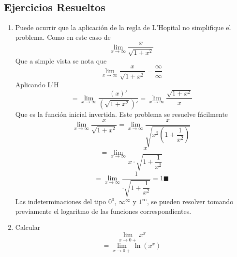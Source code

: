 \documentclass[10pt,twoside]{SelfArx} %
\begin{document}
  
  
  \subsection{Ejercicios Resueltos}
  
   \begin{enumerate}%
		\item  Puede ocurrir que la aplicación de la regla de L'Hopital no simplifique el problema. Como en este caso de 
		\begin{equation}
		\lim\limits_{x\rightarrow\infty}\dfrac{x}{\sqrt{1+x^{2}}}
		\end{equation}
   	Que a simple vista se nota que 
   	\begin{equation}
   	\lim\limits_{x\rightarrow\infty}\dfrac{x}{\sqrt{1+x^{2}}}=\dfrac{\infty}{\infty}
   	\end{equation}
   	Aplicando L'H
   	\begin{equation}
   	=\lim\limits_{x\rightarrow\infty}\dfrac{(x)'}{(\sqrt{1+x^{2}})'}=\lim\limits_{x\rightarrow\infty}\dfrac{\sqrt{1+x^{2}}}{x}
   	\end{equation}
   	Que es la función inicial invertida. Este problema se resuelve fácilmente 
\begin{equation}
   	\lim\limits_{x\rightarrow\infty}\dfrac{x}{\sqrt{1+x^{2}}}=\lim\limits_{x\rightarrow\infty}\dfrac{x}{\sqrt{x^{2}\left (1+\dfrac{1}{x^{2}}\right )}}
\end{equation}
   	\begin{equation}
   	=\lim\limits_{x\rightarrow\infty}\dfrac{x}{x\cdot\sqrt{1+\dfrac{1}{x^{2}}}}
   	\end{equation}
   	\begin{equation}
   	=\lim\limits_{x\rightarrow\infty}\dfrac{1}{\cdot\sqrt{1+\dfrac{1}{x^{2}}}}=1\blacksquare
   	\end{equation}
   	Las indeterminaciones del tipo $ 0^{0} $, $ \infty^{\infty} $ y $ 1^{\infty} $, se pueden resolver tomando previamente el logaritmo de las funciones correspondientes.\\
   	\item Calcular 
   	\begin{equation}
   	\lim\limits_{x\rightarrow0+}x^{x}
   	\end{equation}
\begin{equation}
   	=\lim\limits_{x\rightarrow0+}\ln(x^{x})

\end{equation}
\end{enumerate}
\end{document}
